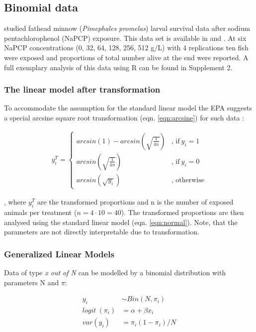 \documentclass{scrartcl}
\begin{document}
\subsection{Binomial data}
\citet{weber_short-term_1989} studied fathead minnow (\textit{Pimephales promelas}) larval survival data after sodium pentachlorophenol (NaPCP) exposure.
This data set is available in \citet{newman_quantitative_2012} and \citet{epa_methods_2002}.
At six NaPCP concentrations (0, 32, 64, 128, 256, 512 \textmu g/L) with 4 replications ten fish were exposed and proportions of total number alive at the end were reported. 
A full exemplary analysis of this data using R \citep{r_core_team_r:_2014} can be found in Supplement 2.

\subsubsection{The linear model after transformation}
To accommodate the assumption for the standard linear model the EPA suggests a special arcsine square root transformation (eqn. \ref{eqn:arcsine}) for such  data \citep{epa_methods_2002}:

\begin{align}
  y_i^T = 
  \begin{cases}  
    arcsin(1) - arcsin(\sqrt{\frac{1}{4n}}) & \text{, if}\ y_i = 1 \\
    arcsin(\sqrt{\frac{1}{4n}}) & \text{, if}\ y_i = 0  \\
    arcsin(\sqrt{y_i}) & \text{, otherwise}
  \end{cases} \label{eqn:arcsine}
\end{align}

, where $y_i^T$ are the transformed proportions and n is the number of exposed animals per treatment ($n = 4 \cdot 10=40$).
The transformed proportions are then analysed using the standard linear model (eqn. \ref{eqn:normal}).
Note, that the parameters are not directly interpretable due to transformation.


\subsubsection{Generalized Linear Models}
Data of type \emph{x out of N} can be modelled by a binomial distribution with parameters N and $\pi$:

\begin{align}
  y_i &\sim Bin(N, \pi_i) \nonumber \\
  logit~(\pi_i) &= \alpha + \beta x_i \label{eqn:bin} \\
  var(y_i) &=  \pi_i (1 - \pi_i) / N \nonumber
\end{align}
\end{document}
